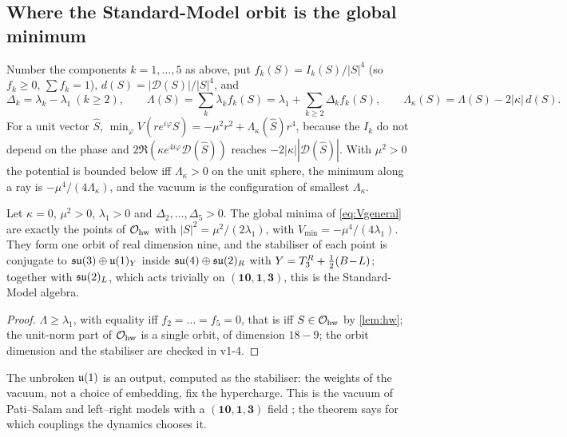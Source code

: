 \subsection{Where the Standard-Model orbit is the global minimum}

Number the components $k=1,\dots,5$ as above, put $f_k(S)=I_k(S)/|S|^4$ (so $f_k\ge0$, $\sum f_k=1$), $d(S)=|\mathcal D(S)|/|S|^4$, and
\[
\Delta_k=\lambda_k-\lambda_1\ (k\ge2),\qquad \Lambda(S)=\sum_k\lambda_kf_k(S)=\lambda_1+\sum_{k\ge2}\Delta_kf_k(S),\qquad \Lambda_\kappa(S)=\Lambda(S)-2|\kappa|\,d(S).
\]
For a unit vector $\hat S$, $\min_\varphi V(re^{i\varphi}\hat S)=-\mu^2r^2+\Lambda_\kappa(\hat S)r^4$, because the $I_k$ do not depend on the phase and
$2\Re(\kappa e^{4i\varphi}\mathcal D(\hat S))$ reaches $-2|\kappa||\mathcal D(\hat S)|$. With $\mu^2>0$ the potential is bounded below iff $\Lambda_\kappa>0$ on the unit
sphere, the minimum along a ray is $-\mu^4/(4\Lambda_\kappa)$, and the vacuum is the configuration of smallest $\Lambda_\kappa$.

\begin{theorem}
\label{thm:select0}
Let $\kappa=0$, $\mu^2>0$, $\lambda_1>0$ and $\Delta_2,\dots,\Delta_5>0$. The global minima of \eqref{eq:Vgeneral} are exactly the points of $\mathcal O_{\rm hw}$ with
$|S|^2=\mu^2/(2\lambda_1)$, with $V_{\min}=-\mu^4/(4\lambda_1)$. They form one orbit of real dimension nine, and the stabiliser of each point is conjugate to
$\mathfrak{su}(3)\oplus\mathfrak{u}(1)_Y$ inside $\mathfrak{su}(4)\oplus\mathfrak{su}(2)_R$ with $Y=T^R_3+\tfrac12(B\!-\!L)$; together with $\mathfrak{su}(2)_L$, which acts trivially on $(\mathbf{10},\mathbf1,\mathbf3)$, this is the
Standard-Model algebra.
\end{theorem}

\begin{proof}
$\Lambda\ge\lambda_1$, with equality iff $f_2=\dots=f_5=0$, that is iff $S\in\mathcal O_{\rm hw}$ by \cref{lem:hw}; the unit-norm part of $\mathcal O_{\rm hw}$ is a single
orbit, of dimension $18-9$; the orbit dimension and the stabiliser are checked in v1-4.
\end{proof}

The unbroken $\mathfrak{u}(1)$ is an output, computed as the stabiliser: the weights of the vacuum, not a choice of embedding, fix the hypercharge. This is the
vacuum of Pati--Salam and left--right models with a $(\mathbf{10},\mathbf1,\mathbf3)$ field \cite{PatiSalam,MohapatraSenjanovic81}; the theorem says for which couplings
the dynamics chooses it.

